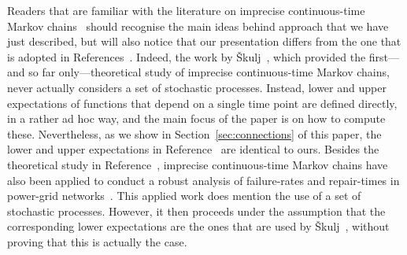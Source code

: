 \documentclass[10pt,a4paper]{paper}
\theoremstyle{definition}
\begin{document}



Readers that are familiar with the literature on imprecise continuous-time Markov chains~\cite{Skulj:2015cq,troffaes2015using} should recognise the main ideas behind approach that we have just described, but will also notice that our presentation differs from the one that is adopted in References~\cite{Skulj:2015cq,troffaes2015using}.
Indeed, the work by {\v{S}}kulj~\cite{Skulj:2015cq}, which provided the first---and so far only---theoretical study of imprecise continuous-time Markov chains, never actually considers a set of stochastic processes. Instead, lower and upper expectations of functions that depend on a single time point are defined directly, in a rather ad hoc way, and the main focus of the paper is on how to compute these. Nevertheless, as we show in Section~\ref{sec:connections} of this paper, the lower and upper expectations in Reference~\cite{Skulj:2015cq} are identical to ours.
Besides the theoretical study in Reference~\cite{Skulj:2015cq}, imprecise continuous-time Markov chains have also been applied to conduct a robust analysis of failure-rates and repair-times in power-grid networks~\cite{troffaes2015using}. This applied work does mention the use of a set of stochastic processes. However, it then proceeds under the assumption that the corresponding lower expectations are the ones that are used by {\v{S}}kulj~\cite{Skulj:2015cq}, without proving that this is actually the case.



\end{document}
